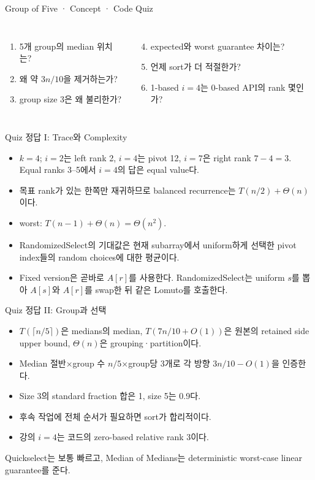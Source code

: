 \begin{frame}{Group of Five · Concept · Code Quiz}
\begin{columns}[T]\begin{enumerate}\item 5개 group의 median 위치는?\item 왜 약 $3n/10$을 제거하는가?\item group size 3은 왜 불리한가?\end{enumerate}\begin{enumerate}\setcounter{enumi}{3}\item expected와 worst guarantee 차이는?\item 언제 sort가 더 적절한가?\item 1-based $i=4$는 0-based API의 rank 몇인가?\end{enumerate}\end{columns}
\end{frame}
\begin{frame}{Quiz 정답 I: Trace와 Complexity}
\small\begin{itemize}
\item $k=4$; $i=2$는 left rank 2, $i=4$는 pivot 12, $i=7$은 right rank $7-4=3$. Equal ranks 3–5에서 $i=4$의 답은 equal value다.
\item 목표 rank가 있는 한쪽만 재귀하므로 balanced recurrence는 $T(n/2)+\Theta(n)$이다.
\item worst: $T(n-1)+\Theta(n)=\Theta(n^2)$.
\item RandomizedSelect의 기대값은 현재 subarray에서 uniform하게 선택한 pivot index들의 random choices에 대한 평균이다.
\item Fixed version은 곧바로 $A[r]$를 사용한다. RandomizedSelect는 uniform $s$를 뽑아 $A[s]$와 $A[r]$를 swap한 뒤 같은 Lomuto를 호출한다.
\end{itemize}
\end{frame}
\begin{frame}{Quiz 정답 II: Group과 선택}
\small\begin{itemize}\setlength{\itemsep}{2pt}
\item $T(\lceil n/5\rceil)$은 medians의 median, $T(7n/10+O(1))$은 원본의 retained side upper bound, $\Theta(n)$은 grouping·partition이다.
\item Median 절반×group 수 $n/5$×group당 3개로 각 방향 $3n/10-O(1)$을 인증한다.
\item Size 3의 standard fraction 합은 1, size 5는 0.9다.
\item 후속 작업에 전체 순서가 필요하면 sort가 합리적이다.
\item 강의 $i=4$는 코드의 zero-based relative rank 3이다.
\end{itemize}
\begin{takeaway}Quickselect는 보통 빠르고, Median of Medians는 deterministic worst-case linear guarantee를 준다.\end{takeaway}
\end{frame}
